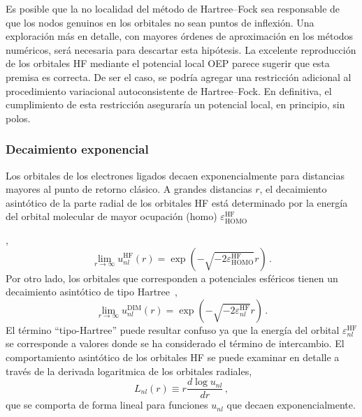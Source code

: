 {{{{Es posible que la no localidad del método de Hartree--Fock sea 
responsable de que los nodos genuinos en los orbitales no sean puntos de 
inflexión. Una exploración más en detalle, con mayores órdenes de 
aproximación en los métodos numéricos, será necesaria para descartar 
esta hipótesis. La excelente reproducción de los orbitales HF mediante 
el potencial local OEP parece sugerir que esta premisa es correcta. De 
ser el caso, se podría agregar una restricción adicional al 
procedimiento variacional autoconsistente de Hartree--Fock. En 
definitiva, el cumplimiento de esta restricción aseguraría un potencial 
local, en principio, sin polos.

\subsubsection*{Decaimiento exponencial}

Los orbitales de los electrones ligados decaen exponencialmente para 
distancias mayores al punto de retorno clásico. A grandes distancias 
$r$, el decaimiento asintótico de la parte radial de los orbitales HF 
está determinado por la energía del orbital molecular de mayor ocupación 
(\acs{homo}) $\varepsilon_{\mathrm{HOMO}}^{\mathrm{HF}}$ 
\cite{Handy:69,Handler:80,Ishida:92}},
\begin{equation}
\lim_{r \rightarrow \infty} u_{nl}^{\mathrm{HF}}(r) =  
\exp(- \sqrt{- 2 \varepsilon_{\mathrm{HOMO}}^{\mathrm{HF}} } r )  \, .
\label{eq:rHF}
\end{equation}
Por otro lado, los orbitales que corresponden a potenciales esféricos 
tienen un decaimiento asintótico de tipo Hartree~\cite{Casida:89},
\begin{equation}
\lim_{r \rightarrow \infty} u_{nl}^{\mathrm{DIM}}(r) =  
\exp(- \sqrt{- 2 \varepsilon_{nl}^{\mathrm{HF}} } r ) \,.
\label{eq:rHlike}
\end{equation}
El término ``tipo-Hartree'' puede resultar confuso ya que la energía 
del orbital $\varepsilon_{nl}^{\mathrm{HF}}$ se corresponde a valores 
donde se ha considerado el término de intercambio. El comportamiento 
asintótico de los orbitales HF se puede examinar en detalle a través de 
la derivada logaritmica de los orbitales radiales, 
\begin{equation}
L_{nl}(r) \equiv r \frac{d \log{u_{nl}}}{d r}\,,
\label{eq:Lnl}
\end{equation}
que se comporta de forma lineal para funciones $u_{nl}$ que decaen 
exponencialmente. 

}}}
